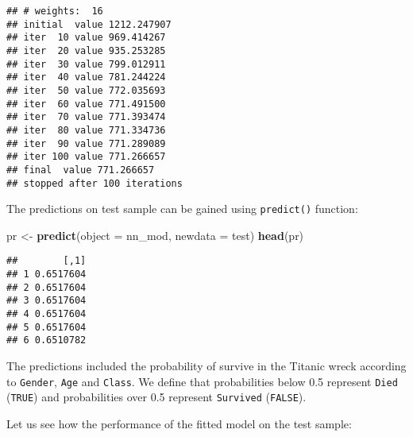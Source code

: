 \documentclass[]{book}
\newenvironment{Shaded}{\begin{snugshade}}{\end{snugshade}}
\newcommand{\KeywordTok}[1]{\textcolor[rgb]{0.13,0.29,0.53}{\textbf{{#1}}}}
\newcommand{\DataTypeTok}[1]{\textcolor[rgb]{0.13,0.29,0.53}{{#1}}}
\newcommand{\DecValTok}[1]{\textcolor[rgb]{0.00,0.00,0.81}{{#1}}}
\newcommand{\StringTok}[1]{\textcolor[rgb]{0.31,0.60,0.02}{{#1}}}
\newcommand{\NormalTok}[1]{{#1}}
\begin{document}
\begin{verbatim}
## # weights:  16
## initial  value 1212.247907 
## iter  10 value 969.414267
## iter  20 value 935.253285
## iter  30 value 799.012911
## iter  40 value 781.244224
## iter  50 value 772.035693
## iter  60 value 771.491500
## iter  70 value 771.393474
## iter  80 value 771.334736
## iter  90 value 771.289089
## iter 100 value 771.266657
## final  value 771.266657 
## stopped after 100 iterations
\end{verbatim}

The predictions on test sample can be gained using \texttt{predict()}
function:

\begin{Shaded}
\begin{Highlighting}[]
\NormalTok{pr <-}\StringTok{ }\KeywordTok{predict}\NormalTok{(}\DataTypeTok{object =} \NormalTok{nn_mod, }\DataTypeTok{newdata =} \NormalTok{test)}
\KeywordTok{head}\NormalTok{(pr)}
\end{Highlighting}
\end{Shaded}

\begin{verbatim}
##        [,1]
## 1 0.6517604
## 2 0.6517604
## 3 0.6517604
## 4 0.6517604
## 5 0.6517604
## 6 0.6510782
\end{verbatim}

The predictions included the probability of survive in the Titanic wreck
according to \texttt{Gender}, \texttt{Age} and \texttt{Class}. We define
that probabilities below 0.5 represent \texttt{Died} (\texttt{TRUE}) and
probabilities over 0.5 represent \texttt{Survived} (\texttt{FALSE}).

\begin{Shaded}
\end{Shaded}

Let us see how the performance of the fitted model on the test sample:

\begin{Shaded}
\end{Shaded}
\end{document}
